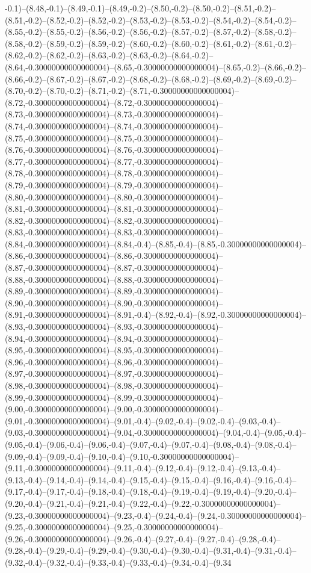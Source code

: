 -0.1)--(8.48,-0.1)--(8.49,-0.1)--(8.49,-0.2)--(8.50,-0.2)--(8.50,-0.2)--(8.51,-0.2)--(8.51,-0.2)--(8.52,-0.2)--(8.52,-0.2)--(8.53,-0.2)--(8.53,-0.2)--(8.54,-0.2)--(8.54,-0.2)--(8.55,-0.2)--(8.55,-0.2)--(8.56,-0.2)--(8.56,-0.2)--(8.57,-0.2)--(8.57,-0.2)--(8.58,-0.2)--(8.58,-0.2)--(8.59,-0.2)--(8.59,-0.2)--(8.60,-0.2)--(8.60,-0.2)--(8.61,-0.2)--(8.61,-0.2)--(8.62,-0.2)--(8.62,-0.2)--(8.63,-0.2)--(8.63,-0.2)--(8.64,-0.2)--(8.64,-0.30000000000000004)--(8.65,-0.30000000000000004)--(8.65,-0.2)--(8.66,-0.2)--(8.66,-0.2)--(8.67,-0.2)--(8.67,-0.2)--(8.68,-0.2)--(8.68,-0.2)--(8.69,-0.2)--(8.69,-0.2)--(8.70,-0.2)--(8.70,-0.2)--(8.71,-0.2)--(8.71,-0.30000000000000004)--(8.72,-0.30000000000000004)--(8.72,-0.30000000000000004)--(8.73,-0.30000000000000004)--(8.73,-0.30000000000000004)--(8.74,-0.30000000000000004)--(8.74,-0.30000000000000004)--(8.75,-0.30000000000000004)--(8.75,-0.30000000000000004)--(8.76,-0.30000000000000004)--(8.76,-0.30000000000000004)--(8.77,-0.30000000000000004)--(8.77,-0.30000000000000004)--(8.78,-0.30000000000000004)--(8.78,-0.30000000000000004)--(8.79,-0.30000000000000004)--(8.79,-0.30000000000000004)--(8.80,-0.30000000000000004)--(8.80,-0.30000000000000004)--(8.81,-0.30000000000000004)--(8.81,-0.30000000000000004)--(8.82,-0.30000000000000004)--(8.82,-0.30000000000000004)--(8.83,-0.30000000000000004)--(8.83,-0.30000000000000004)--(8.84,-0.30000000000000004)--(8.84,-0.4)--(8.85,-0.4)--(8.85,-0.30000000000000004)--(8.86,-0.30000000000000004)--(8.86,-0.30000000000000004)--(8.87,-0.30000000000000004)--(8.87,-0.30000000000000004)--(8.88,-0.30000000000000004)--(8.88,-0.30000000000000004)--(8.89,-0.30000000000000004)--(8.89,-0.30000000000000004)--(8.90,-0.30000000000000004)--(8.90,-0.30000000000000004)--(8.91,-0.30000000000000004)--(8.91,-0.4)--(8.92,-0.4)--(8.92,-0.30000000000000004)--(8.93,-0.30000000000000004)--(8.93,-0.30000000000000004)--(8.94,-0.30000000000000004)--(8.94,-0.30000000000000004)--(8.95,-0.30000000000000004)--(8.95,-0.30000000000000004)--(8.96,-0.30000000000000004)--(8.96,-0.30000000000000004)--(8.97,-0.30000000000000004)--(8.97,-0.30000000000000004)--(8.98,-0.30000000000000004)--(8.98,-0.30000000000000004)--(8.99,-0.30000000000000004)--(8.99,-0.30000000000000004)--(9.00,-0.30000000000000004)--(9.00,-0.30000000000000004)--(9.01,-0.30000000000000004)--(9.01,-0.4)--(9.02,-0.4)--(9.02,-0.4)--(9.03,-0.4)--(9.03,-0.30000000000000004)--(9.04,-0.30000000000000004)--(9.04,-0.4)--(9.05,-0.4)--(9.05,-0.4)--(9.06,-0.4)--(9.06,-0.4)--(9.07,-0.4)--(9.07,-0.4)--(9.08,-0.4)--(9.08,-0.4)--(9.09,-0.4)--(9.09,-0.4)--(9.10,-0.4)--(9.10,-0.30000000000000004)--(9.11,-0.30000000000000004)--(9.11,-0.4)--(9.12,-0.4)--(9.12,-0.4)--(9.13,-0.4)--(9.13,-0.4)--(9.14,-0.4)--(9.14,-0.4)--(9.15,-0.4)--(9.15,-0.4)--(9.16,-0.4)--(9.16,-0.4)--(9.17,-0.4)--(9.17,-0.4)--(9.18,-0.4)--(9.18,-0.4)--(9.19,-0.4)--(9.19,-0.4)--(9.20,-0.4)--(9.20,-0.4)--(9.21,-0.4)--(9.21,-0.4)--(9.22,-0.4)--(9.22,-0.30000000000000004)--(9.23,-0.30000000000000004)--(9.23,-0.4)--(9.24,-0.4)--(9.24,-0.30000000000000004)--(9.25,-0.30000000000000004)--(9.25,-0.30000000000000004)--(9.26,-0.30000000000000004)--(9.26,-0.4)--(9.27,-0.4)--(9.27,-0.4)--(9.28,-0.4)--(9.28,-0.4)--(9.29,-0.4)--(9.29,-0.4)--(9.30,-0.4)--(9.30,-0.4)--(9.31,-0.4)--(9.31,-0.4)--(9.32,-0.4)--(9.32,-0.4)--(9.33,-0.4)--(9.33,-0.4)--(9.34,-0.4)--(9.34